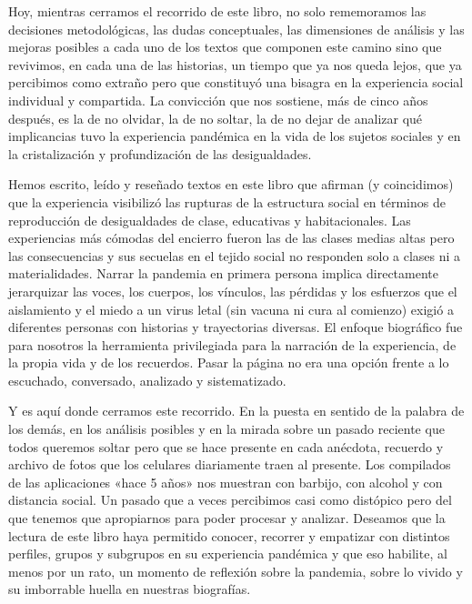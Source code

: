 Hoy, mientras cerramos el recorrido de este libro, no solo rememoramos las decisiones metodológicas, las dudas conceptuales, las dimensiones de análisis y las mejoras posibles a cada uno de los textos que componen este camino sino que revivimos, en cada una de las historias, un tiempo que ya nos queda lejos, que ya percibimos como extraño pero que constituyó una bisagra en la experiencia social individual y compartida. La convicción que nos sostiene, más de cinco años después, es la de no olvidar, la de no soltar, la de no dejar de analizar qué implicancias tuvo la experiencia pandémica en la vida de los sujetos sociales y en la cristalización y profundización de las desigualdades.

Hemos escrito, leído y reseñado textos en este libro que afirman (y coincidimos) que la experiencia visibilizó las rupturas de la estructura social en términos de reproducción de desigualdades de clase, educativas y habitacionales. Las experiencias más cómodas del encierro fueron las de las clases medias altas pero las consecuencias y sus secuelas en el tejido social no responden solo a clases ni a materialidades. Narrar la pandemia en primera persona implica directamente jerarquizar las voces, los cuerpos, los vínculos, las pérdidas y los esfuerzos que el aislamiento y el miedo a un virus letal (sin vacuna ni cura al comienzo) exigió a diferentes personas con historias y trayectorias diversas. El enfoque biográfico fue para nosotros la herramienta privilegiada para la narración de la experiencia, de la propia vida y de los recuerdos. Pasar la página no era una opción frente a lo escuchado, conversado, analizado y sistematizado.

Y es aquí donde cerramos este recorrido. En la puesta en sentido de la palabra de los demás, en los análisis posibles y en la mirada sobre un pasado reciente que todos queremos soltar pero que se hace presente en cada anécdota, recuerdo y archivo de fotos que los celulares diariamente traen al presente. Los compilados de las aplicaciones «hace 5 años» nos muestran con barbijo, con alcohol y con distancia social. Un pasado que a veces percibimos casi como distópico pero del que tenemos que apropiarnos para poder procesar y analizar. Deseamos que la lectura de este libro haya permitido conocer, recorrer y empatizar con distintos perfiles, grupos y subgrupos en su experiencia pandémica y que eso habilite, al menos por un rato, un momento de reflexión sobre la pandemia, sobre lo vivido y su imborrable huella en nuestras biografías.

